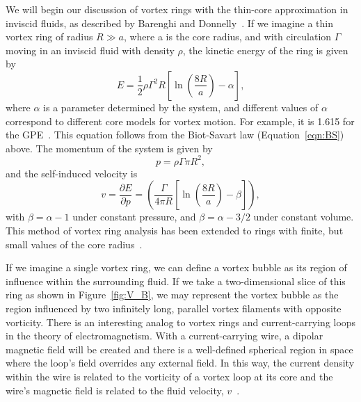 We will begin our discussion of vortex rings with the thin-core approximation in inviscid fluids, as described by Barenghi and Donnelly~\cite{Barenghi2009}. 
If we imagine a thin vortex ring of radius $R\gg a$, where a is the core radius, and  with circulation $\Gamma$ moving in an inviscid fluid with density $\rho$, the kinetic energy of the ring is given by
\begin{equation}
    E = \frac 1 2 \rho \Gamma^2R\left[\ln\left(\frac{8R}{a}\right)-\alpha\right],
\end{equation}
where $\alpha$ is a parameter determined by the system, and different
values of $\alpha$ correspond to different core models for vortex motion. 
For example, it is 1.615 for the GPE~\cite{Roberts1971}.
This equation follows from the Biot-Savart law (Equation~\eqref{eqn:BS}) above. 
The momentum of the system is given by
\begin{equation}
    p = \rho \Gamma \pi R^2,
\end{equation}
and the self-induced velocity is~\cite{Roberts1970}
\begin{equation}
    v = \frac{\partial E}{\partial p} = \left(\frac{\Gamma}{4 \pi R}\left[\ln(\frac{8R}{a})-\beta\right]\right),
\end{equation}
with $\beta = \alpha - 1$ under constant pressure, and $\beta = \alpha - 3/2$ under constant volume. 
This method of vortex ring analysis has been extended to rings with finite, but small values of the core radius~\cite{Fraenkel1970, Fraenkel1972}.

If we imagine a single vortex ring, we can define a vortex bubble as its region of influence within the surrounding fluid. 
If we take a two-dimensional slice of this ring as shown in Figure~\ref{fig:V_B}, we may represent the vortex bubble as the region influenced by two infinitely long, parallel vortex filaments with opposite vorticity. 
There is an interesting analog to vortex rings and current-carrying loops in the theory of electromagnetism. 
With a current-carrying wire, a dipolar magnetic field will be created and there is a well-defined spherical region in space where the loop's field overrides any external field. 
In this way, the current density within the wire is related to the vorticity of a vortex loop at its core and the wire's magnetic field is related to the fluid velocity, $v$~\cite{Fetter1966}.

